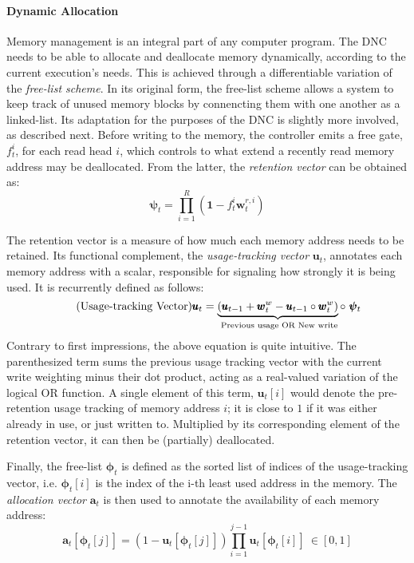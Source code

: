 \documentclass[]{article}
\begin{document}
\paragraph{Dynamic Allocation} Memory management is an integral part of any computer program. The DNC needs to be able to allocate and deallocate memory dynamically, according to the current execution's needs. This is achieved through a differentiable variation of the \textit{free-list scheme}. In its original form, the free-list scheme allows a system to keep track of unused memory blocks by connencting them with one another as a linked-list. Its adaptation for the purposes of the DNC is slightly more involved, as described next. Before writing to the memory, the controller emits a free gate, $f_t^i$, for each read head $i$, which controls to what extend a recently read memory address may be deallocated. From the latter, the \textit{retention vector} can be obtained as:
\[
\tag{Retention Vector}
\pmb{\psi}_t = \prod\limits_{i=1}^{R}{(\pmb{1}-f_t^i \pmb{w}_t^{r,i})}
\]

The retention vector is a measure of how much each memory address needs to be retained. Its functional complement, the \textit{usage-tracking vector} $\pmb{u}_t$, annotates each memory address with a scalar, responsible for signaling how strongly it is being used. It is recurrently defined as follows:
\[
\tag{Usage-tracking Vector}
\pmb{u}_t = \underbrace{(\pmb{u}_{t-1} + \pmb{w}_{t}^{w} - \pmb{u}_{t-1} \circ \pmb{w}_t^{w})}_{\text{ \scriptsize Previous usage OR New write}} \circ \ \pmb{\psi}_t
\]
Contrary to first impressions, the above equation is quite intuitive. The parenthesized term sums the previous usage tracking vector with the current write weighting minus their dot product, acting as a real-valued variation of the logical OR function. A single element of this term, $\pmb{u}_t[i]$ would denote the pre-retention usage tracking of memory address $i$; it is close to $1$ if it was either already in use, or just written to. Multiplied by its corresponding element of the retention vector, it can then be (partially) deallocated.
 
Finally, the free-list $\pmb{\phi}_t$ is defined as the sorted list of indices of the usage-tracking vector, i.e. $\pmb{\phi}_t[i]$ is the index of the i-th least used address in the memory. The \textit{allocation vector} $\pmb{a}_t$ is then  used to annotate the availability of each memory address:
\[
\tag{Allocation Vector}
\label{eqn:Allocation Vector}
\pmb{a}_t[\pmb{\phi}_t[j]] = (1 - \pmb{u}_t[\pmb{\phi}_t[j]])\prod\limits_{i=1}^{j-1}{\pmb{u}_t[\pmb{\phi}_t[i]]} \ \in [0,1]
\]
\end{document}
